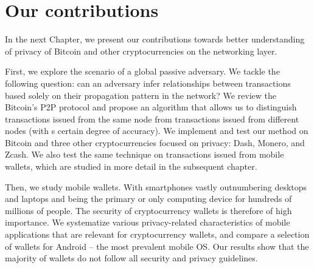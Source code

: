 \section{Our contributions}
\label{sec:C02_S4_Our_Contributions}

In the next Chapter, we present our contributions towards better understanding of privacy of Bitcoin and other cryptocurrencies on the networking layer.

First, we explore the scenario of a global passive adversary.
We tackle the following question: can an adversary infer relationships between transactions based solely on their propagation pattern in the network?
We review the Bitcoin's P2P protocol and propose an algorithm that allows us to distinguish transactions issued from the same node from transactions issued from different nodes (with s certain degree of accuracy).
We implement and test our method on Bitcoin and three other cryptocurrencies focused on privacy: Dash, Monero, and Zcash.
We also test the same technique on transactions issued from mobile wallets, which are studied in more detail in the subsequent chapter.

Then, we study mobile wallets.
With smartphones vastly outnumbering desktops and laptops and being the primary or only computing device for hundreds of millions of people.
The security of cryptocurrency wallets is therefore of high importance.
We systematize various privacy-related characteristics of mobile applications that are relevant for cryptocurrency wallets, and compare a selection of  wallets for Android -- the most prevalent mobile OS.
Our results show that the majority of wallets do not follow all security and privacy guidelines.

